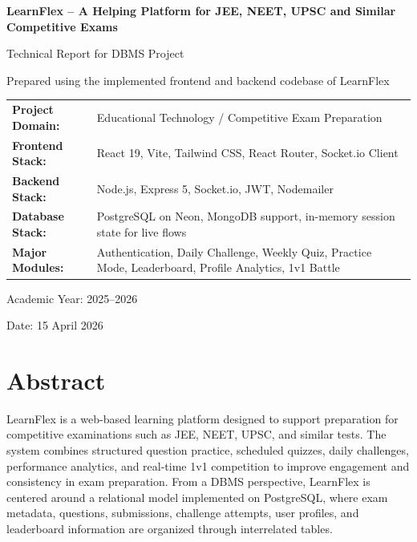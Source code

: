 \documentclass[12pt,a4paper]{article}
\newcommand{\projecttitle}{LearnFlex -- A Helping Platform for JEE, NEET, UPSC and Similar Competitive Exams}
\begin{document}
\begin{titlepage}
  \centering
  \vspace*{2cm}
  {\Huge\bfseries \projecttitle \par}
  \vspace{1cm}
  {\Large Technical Report for DBMS Project \par}
  \vspace{1.5cm}
  {\large Prepared using the implemented frontend and backend codebase of LearnFlex \par}
  \vspace{2cm}

  \begin{tabular}{>{\bfseries}p{4cm}p{9cm}}
    Project Domain: & Educational Technology / Competitive Exam Preparation \\
    Frontend Stack: & React 19, Vite, Tailwind CSS, React Router, Socket.io Client \\
    Backend Stack: & Node.js, Express 5, Socket.io, JWT, Nodemailer \\
    Database Stack: & PostgreSQL on Neon, MongoDB support, in-memory session state for live flows \\
    Major Modules: & Authentication, Daily Challenge, Weekly Quiz, Practice Mode, Leaderboard, Profile Analytics, 1v1 Battle \\
  \end{tabular}

  \vfill
  {\large Academic Year: 2025--2026 \par}
  \vspace{0.3cm}
  {\large Date: 15 April 2026 \par}
\end{titlepage}

\tableofcontents
\newpage

\section{Abstract}
LearnFlex is a web-based learning platform designed to support preparation for competitive examinations such as JEE, NEET, UPSC, and similar tests. The system combines structured question practice, scheduled quizzes, daily challenges, performance analytics, and real-time 1v1 competition to improve engagement and consistency in exam preparation. From a DBMS perspective, LearnFlex is centered around a relational model implemented on PostgreSQL, where exam metadata, questions, submissions, challenge attempts, user profiles, and leaderboard information are organized through interrelated tables.
\end{document}
